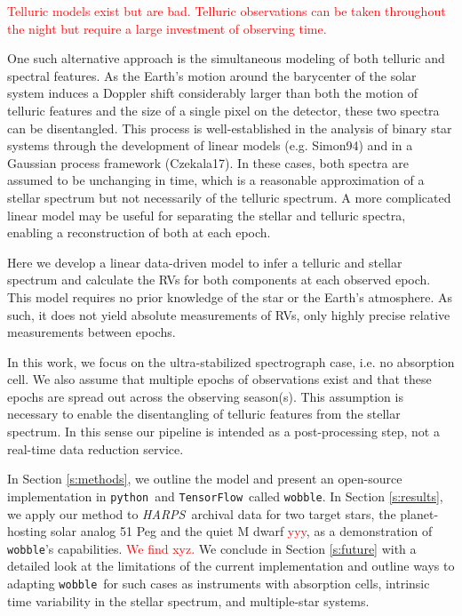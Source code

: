 \documentclass[twocolumn]{aastex62}
\newcommand{\todo}[1]{\textcolor{red}{#1}}  %
\newcommand{\acronym}[1]{{\small{#1}}}
\newcommand{\project}[1]{\textsl{#1}}
\newcommand{\code}[1]{\texttt{#1}}
\newcommand{\HARPS}{\project{\acronym{HARPS}}}
\newcommand{\RV}{\acronym{RV}}
\newcommand{\wobble}{\code{wobble}}
\newcommand{\TF}{\code{TensorFlow}}
\newcommand{\python}{\code{python}}
\begin{document}
\todo{Telluric models exist but are bad. Telluric observations can be taken throughout the night but require a large investment of observing time.}

One such alternative approach is the simultaneous modeling of both telluric and spectral features. 
As the Earth's motion around the barycenter of the solar system induces a Doppler shift considerably larger than both the motion of telluric features and the size of a single pixel on the detector, these two spectra can be disentangled.
This process is well-established in the analysis of binary star systems through the development of linear models
(e.g. Simon94) and in a Gaussian process framework (Czekala17).
In these cases, both spectra are assumed to be unchanging in time, which is a reasonable approximation of a stellar spectrum but not necessarily of the telluric spectrum.
A more complicated linear model may be useful for separating the stellar and telluric spectra, enabling a reconstruction of both at each epoch.

Here we develop a linear data-driven model to infer a telluric and stellar spectrum and calculate the RVs for both components at each observed epoch. 
This model requires no prior knowledge of the star or the Earth's atmosphere. 
As such, it does not yield absolute measurements of \RV s, only highly precise relative measurements between epochs.

In this work, we focus on the ultra-stabilized spectrograph case, i.e. no absorption cell. 
We also assume that multiple epochs of observations exist and that these epochs are spread out across the observing season(s). 
This assumption is necessary to enable the disentangling of telluric features from the stellar spectrum. 
In this sense our pipeline is intended as a post-processing step, not a real-time data reduction service. 

In Section \ref{s:methods}, we outline the model and present an open-source implementation in \python\ and \TF\ called \wobble. 
In Section \ref{s:results}, we apply our method to \HARPS\ archival data for two target stars, the planet-hosting solar analog 51 Peg and the quiet M dwarf \todo{yyy}, as a demonstration of \wobble's capabilities. 
\todo{We find xyz.} 
We conclude in Section \ref{s:future} with a detailed look at the limitations of the current implementation and outline ways to adapting \wobble\ for such cases as instruments with absorption cells, intrinsic time variability in the stellar spectrum, and multiple-star systems.
\end{document}
